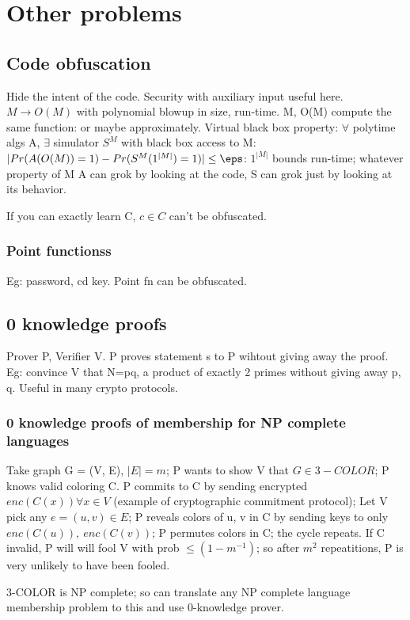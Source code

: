 \documentclass[oneside, article]{memoir}
\begin{document}
\chapter{Other problems}
\section{Code obfuscation}
Hide the intent of the code. Security with auxiliary input useful here. $M \to O(M)$ with polynomial blowup in size, run-time. M, O(M) compute the same function: or maybe approximately. Virtual black box property: $\forall$ polytime algs A, $\exists$ simulator $S^{M}$ with black box access to M: $|Pr(A(O(M)) = 1) - Pr(S^{M}(1^{|M|}) = 1)| \leq \eps$: $1^{|M|}$ bounds run-time; whatever property of M A can grok by looking at the code, S can grok just by looking at its behavior.

If you can exactly learn C, $c \in C$ can't be obfuscated.

\subsection{Point functionss}
Eg: password, cd key. Point fn can be obfuscated.  \why

\section{0 knowledge proofs}
Prover P, Verifier V. P proves statement s to P wihtout giving away the proof. Eg: convince V that N=pq, a product of exactly 2 primes without giving away p, q. Useful in many crypto protocols.

\subsection{0 knowledge proofs of membership  for NP complete languages}
Take graph G = (V, E), $|E|=m$; P wants to show V that $G \in 3-COLOR$; P knows valid coloring C. P commits to C by sending encrypted \\
$enc(C(x)) \forall x\in V$ (example of cryptographic commitment protocol); Let V pick any $e = (u, v) \in E$; P reveals colors of u, v in C by sending keys to only \\
$enc(C(u)),\ enc(C(v))$; P permutes colors in C; the cycle repeats. If C invalid, P will will fool V with prob $\leq (1-m^{-1})$; so after $m^{2}$ repeatitions, P is very unlikely to have been fooled. 

3-COLOR is NP complete; so can translate any NP complete language membership problem to this and use 0-knowledge prover.
\end{document}
